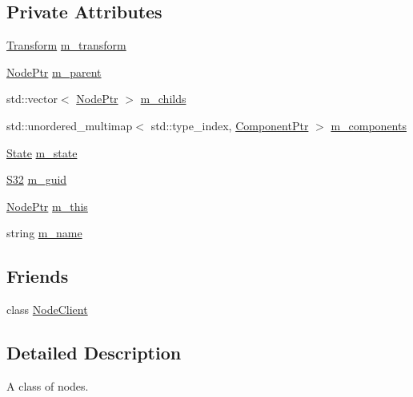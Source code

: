 \subsection*{Private Attributes}
\begin{DoxyCompactItemize}
\item 
\hyperlink{classmage_1_1_transform}{Transform} \hyperlink{classmage_1_1_node_a0f4dd0c46d9713fd64b0e562862afac6}{m\+\_\+transform}
\item 
\hyperlink{classmage_1_1_node_ac575dc006e0ae1134277ade977dc06b6}{Node\+Ptr} \hyperlink{classmage_1_1_node_aa04f166b52fca444c8756c0864a16cde}{m\+\_\+parent}
\item 
std\+::vector$<$ \hyperlink{classmage_1_1_node_ac575dc006e0ae1134277ade977dc06b6}{Node\+Ptr} $>$ \hyperlink{classmage_1_1_node_a1d1d432f46c61932b5167d27d20cc383}{m\+\_\+childs}
\item 
std\+::unordered\+\_\+multimap$<$ std\+::type\+\_\+index, \hyperlink{classmage_1_1_node_a46b7e1f4f5b98bfa78ed96a80797a4ba}{Component\+Ptr} $>$ \hyperlink{classmage_1_1_node_a804d53398f193b6b06f883131ab7415d}{m\+\_\+components}
\item 
\hyperlink{namespacemage_a8159a53ed2ac3a0fe7058b2a051fa969}{State} \hyperlink{classmage_1_1_node_a76b775e32bb001c54a9927461eaf7926}{m\+\_\+state}
\item 
\hyperlink{namespacemage_a642e05c5c83642b6946703615cdbf2da}{S32} \hyperlink{classmage_1_1_node_a1342131cdbad63e1eb068d22bc6f038d}{m\+\_\+guid}
\item 
\hyperlink{classmage_1_1_node_ac575dc006e0ae1134277ade977dc06b6}{Node\+Ptr} \hyperlink{classmage_1_1_node_ab056e1563dca22433efa152f4b6da46f}{m\+\_\+this}
\item 
string \hyperlink{classmage_1_1_node_a476cc21fa65cdf9bde0f11fe08b5a707}{m\+\_\+name}
\end{DoxyCompactItemize}
\subsection*{Friends}
\begin{DoxyCompactItemize}
\item 
class \hyperlink{classmage_1_1_node_a6e6c0f9acf9f770577b16be7a41ae51e}{Node\+Client}
\end{DoxyCompactItemize}


\subsection{Detailed Description}
A class of nodes. 


